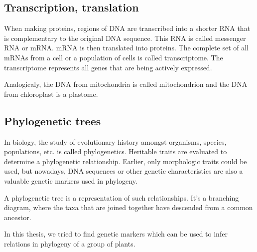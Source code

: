 \subsection{Transcription, translation}%
When making proteins, regions of DNA are transcribed into a shorter RNA that is complementary to the original DNA sequence. 
This RNA is called messenger RNA or mRNA. mRNA is then translated into proteins. The complete set of all mRNAs from a 
cell or a population of cells is called transcriptome. The transcriptome represents all genes that are being actively expressed. 

Analogicaly, the DNA from mitochondria is called mitochondrion and the DNA from chloroplast is a plastome. 
\cite{cellbiology}


\subsection{Phylogenetic trees}
In biology, the study of evolutionary history amongst organisms, species, populations, etc. is called phylogenetics. Heritable traits 
are evaluated to determine a phylogenetic relationship. Earlier, only morphologic traits could be used, but nowadays, DNA sequences 
or other genetic characteristics are also a valuable genetic markers used in phylogeny. 
\cite{phylogenetics}

A phylogenetic tree is a representation of such relationships. It's a branching diagram, where the taxa that are joined together have 
descended from a common ancestor. 

In this thesis, we tried to find genetic markers which can be used to infer relations in phylogeny of a group of plants. 
\cite{phylogenetic_tree}
